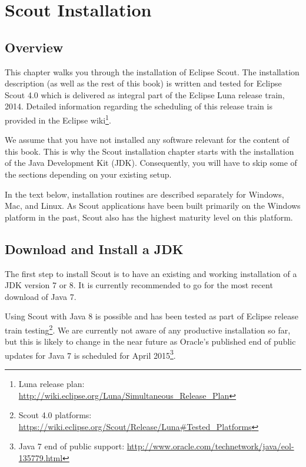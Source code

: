 \documentclass[a4paper,10pt,twoside]{book}
\begin{document}
  \sloppy
\fi


\chapter{Scout Installation}

\section{Overview}

This chapter walks you through the installation of Eclipse Scout. 
The installation description (as well as the rest of this book) is written and tested for Eclipse Scout 4.0 which is delivered as integral part of the Eclipse Luna release train, 2014.
Detailed information regarding the scheduling of this release train is provided in the Eclipse
wiki\footnote{Luna release plan: \url{http://wiki.eclipse.org/Luna/Simultaneous_Release_Plan}}.

We assume that you have not installed any software relevant for the content of this book.
This is why the Scout installation chapter starts with the installation of the Java Development Kit (JDK).
Consequently, you will have to skip some of the sections depending on your existing setup.

In the text below, installation routines are described separately for Windows, Mac, and Linux.
As Scout applications have been built primarily on the Windows platform in the past, Scout also has the highest maturity level on this platform.

\section{Download and Install a JDK}

The first step to install Scout is to have an existing and working installation of a JDK version 7 or 8.
It is currently recommended to go for the most recent download of Java 7.

Using Scout with Java 8 is possible and has been tested as part of Eclipse release train testing\footnote{
Scout 4.0 platforms: \url{https://wiki.eclipse.org/Scout/Release/Luna\#Tested_Platforms}}. 
We are currently not aware of any productive installation so far, but this is likely to change in the near future as Oracle's published end of public updates for Java 7 is scheduled for April 2015\footnote{
Java 7 end of public support: \url{http://www.oracle.com/technetwork/java/eol-135779.html}}.
\end{document}
